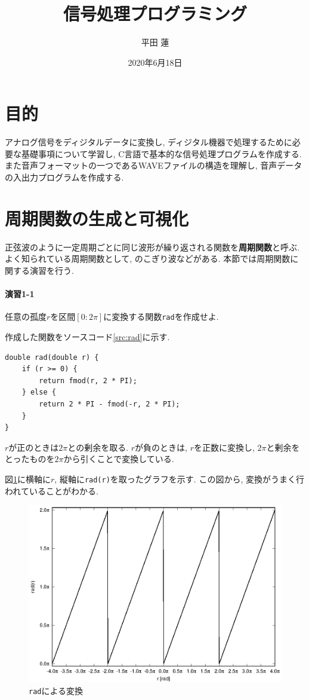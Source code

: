 \documentclass[titlepage]{jsarticle}
\title{信号処理プログラミング}
\author{平田 蓮}
\date{2020年6月18日}
\begin{document}
\maketitle
\section{目的}
    アナログ信号をディジタルデータに変換し, ディジタル機器で処理するために必要な基礎事項について学習し,
    C言語で基本的な信号処理プログラムを作成する.
    また音声フォーマットの一つであるWAVEファイルの構造を理解し, 音声データの入出力プログラムを作成する.

\section{周期関数の生成と可視化}
    正弦波のように一定周期ごとに同じ波形が繰り返される関数を\textbf{周期関数}と呼ぶ.
    よく知られている周期関数として, のこぎり波などがある.
    本節では周期関数に関する演習を行う.

    \paragraph{演習1-1} 任意の孤度$r$を区間$[0:2\pi]$に変換する関数\verb|rad|を作成せよ.

        作成した関数をソースコード\ref{src:rad}に示す.

        \begin{lstlisting}[caption=rad.c, label=src:rad]
double rad(double r) {
    if (r >= 0) {
        return fmod(r, 2 * PI);
    } else {
        return 2 * PI - fmod(-r, 2 * PI);
    }
}\end{lstlisting}

        $r$が正のときは$2\pi$との剰余を取る.
        $r$が負のときは, $r$を正数に変換し, $2\pi$と剰余をとったものを$2\pi$から引くことで変換している.

        図\ref{fig:rad}に横軸に$r$, 縦軸に\verb|rad(r)|を取ったグラフを示す.
        この図から, 変換がうまく行われていることがわかる.

        \begin{figure}[ht]
            \centering
            \includegraphics[width=12cm]{images/rad.eps}
            \cprotect\caption{\verb|rad|による変換}
            \label{fig:rad}
        \end{figure}
\end{document}
